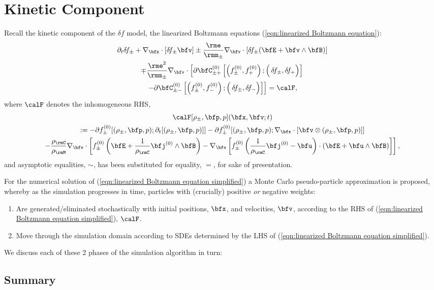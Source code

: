 \chapter{Kinetic Component}\label{cha:kinetic component}
    Recall the kinetic component of the $\delta\!f$ model, the linearized Boltzmann equations (\ref{eqn:linearized Boltzmann equation}):
    \begin{multline}\label{eqn:linearized Boltzmann equation simplified}
        \partial_{t}\delta\!f_{\pm} + \nabla_{\bfx}\cdot[\delta\!f_{\pm}\bfv] \pm \frac{\rme}{\rmm_{\pm}}\nabla_{\bfv}\cdot[\delta\!f_{\pm}(\bfE + \bfv\wedge\bfB)]  \\
        \mp \frac{\rme^{2}}{\rmm_{\pm}}\nabla_{\bfv}\cdot\left[\partial\bfC_{\pm+}^{(0)}\left[\left(f_{\pm}^{(0)}, f_{+}^{(0)}\right); \left({\color{white} f_{+}^{(0)}}\!\!\!\!\!\!\!\!\!\delta\!f_{\pm}, \delta\!f_{+}\right)\right]\right.  \\
        \left.- \partial\bfC_{\pm-}^{(0)}\left[\left(f_{\pm}^{(0)}, f_{-}^{(0)}\right); \left({\color{white} f_{+}^{(0)}}\!\!\!\!\!\!\!\!\!\delta\!f_{\pm}, \delta\!f_{-}\right)\right]\right]  =  \calF,
    \end{multline}
    where $\calF$ denotes the inhomogeneous RHS,
    \begin{multline}
        \calF[\rho_{\pm}, \bfp, p](\bfx, \bfv; t)  \\
        :=  - \partial f_{\pm}^{(0)}[(\rho_{\pm}, \bfp, p); \partial_{t}[(\rho_{\pm}, \bfp, p)]] - \partial f_{\pm}^{(0)}[(\rho_{\pm}, \bfp, p); \nabla_{\bfx}\cdot[\bfv\otimes(\rho_{\pm}, \bfp, p)]]  \\
        - \frac{\rho_{\rmC}}{\rho_{\rmM}}\nabla_{\bfv}\cdot\left[f_{\pm}^{(0)}\left(\bfE + \frac{1}{\rho_{\rmC}}\bfj^{(0)}\wedge\bfB\right) - \nabla_{\bfv}\left[f_{\pm}^{(0)}\left(\frac{1}{\rho_{\rmC}}\bfj^{(0)} - \bfu\right)\cdot\left(\bfE + \bfu\wedge\bfB\right)\right]\right],
    \end{multline}
    and asymptotic equalities, $\sim$, has been substituted for equality, $=$, for sake of presentation.

    For the numerical solution of (\ref{eqn:linearized Boltzmann equation simplified}) a Monte Carlo pseudo-particle approximation is proposed, whereby as the simulation progresses in time, particles with (crucially) positive \emph{or} negative weights:
    \begin{enumerate}
        \item  Are generated/eliminated stochastically with initial positions, $\bfx$, and velocities, $\bfv$, according to the RHS of (\ref{eqn:linearized Boltzmann equation simplified}), $\calF$.
        \item  Move through the simulation domain according to SDEs determined by the LHS of (\ref{eqn:linearized Boltzmann equation simplified}).
    \end{enumerate}
    We discuss each of these 2 phases of the simulation algorithm in turn:


    
    



    \section*{Summary}
    